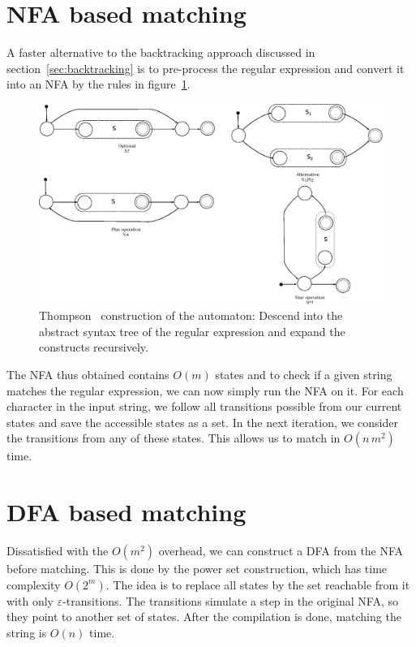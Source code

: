 \documentclass[11pt,a4paper,twoside,openright]{Thesis}
\theoremstyle{definition}
\newcommand{\Figref}[1]{figure~\ref{fig:#1}}
\newcommand{\Secref}[1]{section~\ref{sec:#1}}
\begin{document}
\section{NFA based matching}\label{sec:nfa-match}
A faster alternative to the backtracking approach discussed in
\Secref{backtracking} is to pre-process the regular expression and convert it
into an NFA by the rules in \Figref{thompson-construction-simple}.

\begin{figure}[htb] \includegraphics[width=\linewidth]{graphs/thompson-simple}
  \caption[Thompson construction]{Thompson~\cite{Thom68a} construction of the
automaton: Descend into the abstract syntax tree of the regular
expression and expand the constructs recursively.}
\label{fig:thompson-construction-simple}
\end{figure}

The NFA thus obtained contains $O(m)$ states and to check if a given string
matches the regular expression, we can now simply run the NFA on it. For each
character in the input string, we follow all transitions possible from our
current states and save the accessible states as a set. In the next
iteration, we consider the transitions from any of these states. This allows
us to match in $O(n\, m^2)$ time.

\section{DFA based matching}\label{sec:dfa-match}
Dissatisfied with the $O(m^2)$ overhead, we can construct a DFA from the NFA
before matching. This is done by the power set construction\cite{Sips05a},
which has time complexity $O(2^m)$. The idea is to replace all states by the
set reachable from it with only $\varepsilon$-transitions. The transitions
simulate a step in the original NFA, so they point to another set of states.
After the compilation is done, matching the string is $O(n)$ time.
\end{document}
